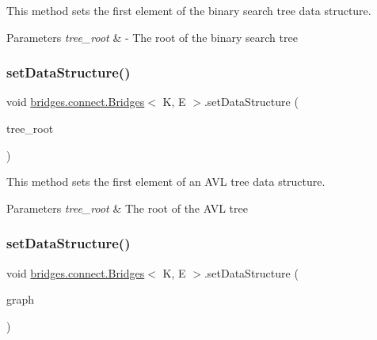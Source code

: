 This method sets the first element of the binary search tree data structure.


\begin{DoxyParams}{Parameters}
{\em tree\+\_\+root} & -\/ The root of the binary search tree \\
\hline
\end{DoxyParams}
\hypertarget{classbridges_1_1connect_1_1_bridges_a702c3f88840e100ad0182110627e60f5}{}\label{classbridges_1_1connect_1_1_bridges_a702c3f88840e100ad0182110627e60f5} 
\subsubsection{\texorpdfstring{set\+Data\+Structure()}{setDataStructure()}\hspace{0.1cm}{\footnotesize\ttfamily [10/12]}}
{\footnotesize\ttfamily void \hyperlink{classbridges_1_1connect_1_1_bridges}{bridges.\+connect.\+Bridges}$<$ K, E $>$.set\+Data\+Structure (\begin{DoxyParamCaption}\item[{\hyperlink{classbridges_1_1base_1_1_a_v_l_tree_element}{A\+V\+L\+Tree\+Element}$<$ K, E $>$}]{tree\+\_\+root }\end{DoxyParamCaption})}

This method sets the first element of an A\+VL tree data structure.


\begin{DoxyParams}{Parameters}
{\em tree\+\_\+root} & The root of the A\+VL tree \\
\hline
\end{DoxyParams}
\hypertarget{classbridges_1_1connect_1_1_bridges_aa5dc1d094955a486e649fdb05d66502f}{}\label{classbridges_1_1connect_1_1_bridges_aa5dc1d094955a486e649fdb05d66502f} 
\subsubsection{\texorpdfstring{set\+Data\+Structure()}{setDataStructure()}\hspace{0.1cm}{\footnotesize\ttfamily [11/12]}}
{\footnotesize\ttfamily void \hyperlink{classbridges_1_1connect_1_1_bridges}{bridges.\+connect.\+Bridges}$<$ K, E $>$.set\+Data\+Structure (\begin{DoxyParamCaption}\item[{\hyperlink{classbridges_1_1base_1_1_graph_adj_list}{Graph\+Adj\+List}$<$ K, E $>$}]{graph }\end{DoxyParamCaption})}

